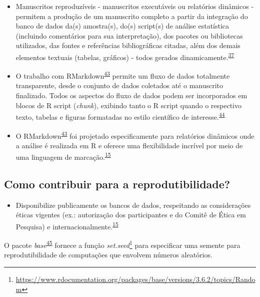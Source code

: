 \documentclass[
  a4paper,
]{book}
\providecommand{\tightlist}{%
  \setlength{\itemsep}{0pt}\setlength{\parskip}{0pt}}
\renewcommand{\href}[2]{#2\footnote{\url{#1}}}
\newenvironment{infobox}[1]
  {
  \begin{itemize}
  \renewcommand{\labelitemi}{
    \raisebox{-.7\height}[0pt][0pt]{
      {\setkeys{Gin}{width=3em,keepaspectratio}
        \texttt{[image: \#1]}}
    }
  }
  \setlength{\fboxsep}{1em}
  \begin{blackbox}
  \item
  }
  {
  \end{blackbox}
  \end{itemize}
  }
\begin{document}
\begin{itemize}
\item
  Manuscritos reproduzíveis - manuscritos executáveis ou relatórios dinâmicos - permitem a produção de um manuscrito completo a partir da integração do banco de dados da(s) amostra(s), do(s) script(s) de análise estatística (incluindo comentários para sua interpretação), dos pacotes ou bibliotecas utilizados, das fontes e referências bibliográficas citadas, além dos demais elementos textuais (tabelas, gráficos) - todos gerados dinamicamente.\textsuperscript{\protect\hyperlink{ref-hinsen2011}{37}}
\item
  O trabalho com RMarkdown\textsuperscript{\protect\hyperlink{ref-R-rmarkdown}{43}} permite um fluxo de dados totalmente transparente, desde o conjunto de dados coletados até o manuscrito finalizado. Todos os aspectos do fluxo de dados podem ser incorporados em blocos de R script (\emph{chunk}), exibindo tanto o R script quando o respectivo texto, tabelas e figuras formatadas no estilo científico de interesse.\textsuperscript{\protect\hyperlink{ref-holmes2021}{44}}
\item
  O RMarkdown\textsuperscript{\protect\hyperlink{ref-R-rmarkdown}{43}} foi projetado especificamente para relatórios dinâmicos onde a análise é realizada em R e oferece uma flexibilidade incrível por meio de uma linguagem de marcação.\textsuperscript{\protect\hyperlink{ref-mair2016}{15}}
\end{itemize}

\hypertarget{como-contribuir-para-a-reprodutibilidade}{%
\subsection{Como contribuir para a reprodutibilidade?}\label{como-contribuir-para-a-reprodutibilidade}}

\begin{itemize}
\tightlist
\item
  Disponibilize publicamente os bancos de dados, respeitando as considerações éticas vigentes (ex.: autorização dos participantes e do Comitê de Ética em Pesquisa) e internacionalmente.\textsuperscript{\protect\hyperlink{ref-mair2016}{15}}
\end{itemize}

\begin{infobox}{images/Rlogo}
O pacote \emph{base}\textsuperscript{\protect\hyperlink{ref-base-5}{45}} fornece a função \href{https://www.rdocumentation.org/packages/base/versions/3.6.2/topics/Random}{\emph{set.seed}} para especificar uma semente para reprodutibilidade de computações que envolvem números aleatórios.

\end{infobox}
\end{document}
